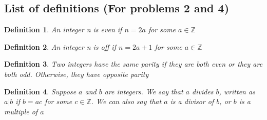 \documentclass[12pt]{article}
\newtheorem{definition}{Definition}
\newcommand{\Z}{\mathbb{Z}}
\begin{document}
\subsection*{List of definitions (For problems 2 and 4)}

\begin{definition}
An integer n is even if $n = 2a$ for some $a \in \Z$
\end{definition}

\begin{definition}
An integer n is off if $n = 2a + 1$ for some $a \in \Z$
\end{definition}

\begin{definition}
Two integers have the same parity if they are both even or they are both odd. Otherwise, they have opposite parity
\end{definition}

\begin{definition}
Suppose $a$ and $b$ are integers. We say that $a$ divides $b$, written as $a|b$ if $b = ac$ for some $c \in \Z$. We can also say that $a$ is a divisor of $b$, or $b$ is a multiple of $a$
\end{definition}
\end{document}
